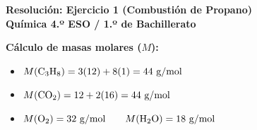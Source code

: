﻿\documentclass[11pt,a4paper]{article}
\begin{document}
\pagestyle{empty}

\begin{center}
    {\LARGE \textbf{Resolución: Ejercicio 1 (Combustión de Propano)}}\\[4pt]
    {\large \textbf{Química 4.º ESO / 1.º de Bachillerato}}
\end{center}

\vspace{0.4cm}
\noindent\textbf{Cálculo de masas molares ($M$):}
\begin{itemize}[leftmargin=1.5em, itemsep=2pt]
    \item $M(\ce{C3H8}) = 3(12) + 8(1) = 44\text{ g/mol}$
    \item $M(\ce{CO2}) = 12 + 2(16) = 44\text{ g/mol}$
    \item $M(\ce{O2}) = 32\text{ g/mol} \qquad M(\ce{H2O}) = 18\text{ g/mol}$
\end{itemize}
\end{document}
